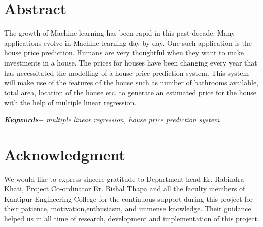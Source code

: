 


\KECcoverpage  %
\KECtitlepage  %




\chapter*{Abstract} %
The growth of Machine learning has been rapid in this past decade. Many applications evolve in Machine learning day by day. One such application is the house price prediction. Humans are very thoughtful when they want to make investments in a house. The prices for houses have been changing every year that has necessitated the modelling of a house price prediction system. This system will make use of the features of the house such as number of bathrooms available, total area, location of the house etc. to generate an estimated price for the house with the help of multiple linear regression.
\par
\textbf{\textit{Keywords$-$}} \emph{multiple linear regression, house price prediction system}

\chapter*{Acknowledgment}
We would like to express sincere gratitude to Department head Er. Rabindra Khati, Project Co-ordinator Er. Bishal Thapa and all the faculty members of Kantipur Engineering College for the continuous support during this project for their patience, motivation,enthusiasm, and immense knowledge. Their guidance helped us in all time of research, development and implementation of this project.   \par
\begin{flushright}
\vskip -20pt
\submittedBy

\end{flushright}

